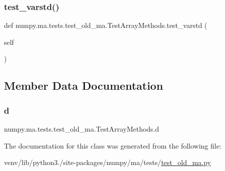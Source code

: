 \subsubsection{\texorpdfstring{test\+\_\+varstd()}{test\_varstd()}}
{\footnotesize\ttfamily def numpy.\+ma.\+tests.\+test\+\_\+old\+\_\+ma.\+Test\+Array\+Methods.\+test\+\_\+varstd (\begin{DoxyParamCaption}\item[{}]{self }\end{DoxyParamCaption})}



\subsection{Member Data Documentation}
\mbox{\label{classnumpy_1_1ma_1_1tests_1_1test__old__ma_1_1TestArrayMethods_a4a6286d47455cf911ff482c1eb9d3f35}} 
\subsubsection{\texorpdfstring{d}{d}}
{\footnotesize\ttfamily numpy.\+ma.\+tests.\+test\+\_\+old\+\_\+ma.\+Test\+Array\+Methods.\+d}



The documentation for this class was generated from the following file\+:\begin{DoxyCompactItemize}
\item 
venv/lib/python3./site-\/packages/numpy/ma/tests/\hyperlink{test__old__ma_8py}{test\+\_\+old\+\_\+ma.\+py}\end{DoxyCompactItemize}
